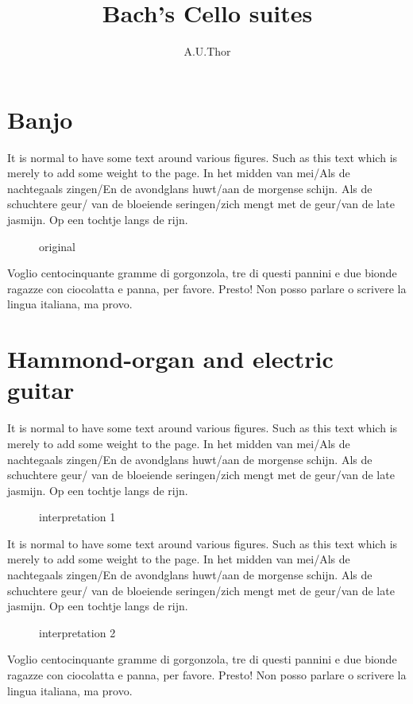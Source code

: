 \documentclass{article}
\title{Bach's Cello suites}
\author{A.U.Thor}
\begin{document}
\maketitle

\section{Banjo}

It is normal to have some text around various figures. Such as this
text which is merely to add some weight to the page. In het midden van
mei/Als de nachtegaals zingen/En de avondglans huwt/aan de morgense schijn.
Als de schuchtere geur/ van de bloeiende seringen/zich mengt met de
geur/van de late jasmijn. Op een tochtje langs de rijn.

\def\EndLilyPondOutput{}
\begin{figure}[h]
  \begin{center}
    \leavevmode
    
    \caption{original}
  \end{center}
\end{figure}

Voglio centocinquante gramme di gorgonzola, tre di questi pannini e due bionde
ragazze con ciocolatta e panna, per favore. Presto! Non posso parlare
o scrivere la lingua italiana, ma provo.

\section{Hammond-organ and electric guitar}

It is normal to have some text around various figures. Such as this
text which is merely to add some weight to the page. In het midden van
mei/Als de nachtegaals zingen/En de avondglans huwt/aan de morgense schijn.
Als de schuchtere geur/ van de bloeiende seringen/zich mengt met de
geur/van de late jasmijn. Op een tochtje langs de rijn.

\begin{figure}[h]
  \begin{center}
    \leavevmode

    
    \caption{interpretation 1}
  \end{center}
\end{figure}

It is normal to have some text around various figures. Such as this
text which is merely to add some weight to the page. In het midden van
mei/Als de nachtegaals zingen/En de avondglans huwt/aan de morgense schijn.
Als de schuchtere geur/ van de bloeiende seringen/zich mengt met de
geur/van de late jasmijn. Op een tochtje langs de rijn.

\begin{figure}[h]
  \begin{center}
    \leavevmode

    
    \caption{interpretation 2}
  \end{center}
\end{figure}

Voglio centocinquante gramme di gorgonzola, tre di questi pannini e due bionde
ragazze con ciocolatta e panna, per favore. Presto! Non posso parlare
o scrivere la lingua italiana, ma provo.
\end{document}
